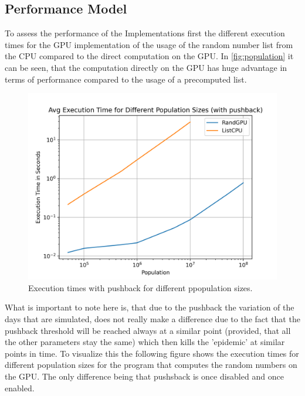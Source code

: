 \documentclass[12pt,a4paper]{article}
\begin{document}
\subsection*{Performance Model}
To assess the performance of the Implementations first the different execution times for the GPU implementation of the usage of the random number list from the CPU compared to the direct computation on the GPU. In \autoref*{fig:population} it can be seen, that the computation directly on the GPU has huge advantage in terms of performance compared to the usage of a precomputed list.
\begin{figure}[H]
    \centering
    \includegraphics[width=12cm]{../Population.png}
    \caption{Execution times with pushback for different ppopulation sizes.}
    \label{fig:population}
\end{figure}
What is important to note here is, that due to the pushback the variation of the days that are simulated, does not really make a difference due to the fact that the pushback threshold will be reached always at a similar point (provided, that all the other parameters stay the same) which then kills the 'epidemic' at similar points in time. To visualize this the following figure shows the execution times for different population sizes for the program that computes the random numbers on the GPU. The only difference being that pushsback is once disabled and once enabled.
\end{document}
